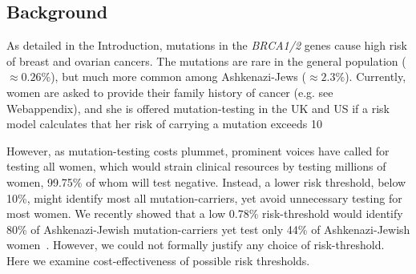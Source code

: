 \documentclass[11pt, letterpaper]{article}
\begin{document}
\subsection{Background}
\label{sec:BRCAbackground}

As detailed in the Introduction, mutations in the \textit{BRCA1/2} genes cause high risk of breast and ovarian cancers.  The mutations are rare in the general population ($\approx0.26\%$), but much more common among Ashkenazi-Jews ($\approx2.3\%$).  Currently, women are asked to provide their family history of cancer (e.g. see Webappendix), and she is offered mutation-testing in the UK and US if a risk model calculates that her risk of carrying a mutation exceeds 10%

However, as mutation-testing costs plummet, prominent voices have called for testing all women, which would strain clinical resources by testing millions of women, 99.75\% of whom will test negative.  Instead, a lower risk threshold, below 10\%, might identify most all mutation-carriers, yet avoid unnecessary testing for most women.  We recently showed that a low 0.78\% risk-threshold would identify 80\% of Ashkenazi-Jewish mutation-carriers yet test only 44\% of Ashkenazi-Jewish women~\citep{Best2019}.  However, we could not formally justify any choice of risk-threshold.  Here we examine cost-effectiveness of possible risk thresholds.

%
\end{document}
